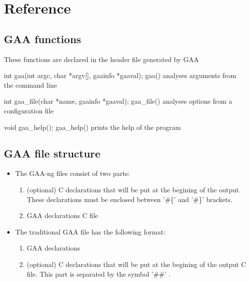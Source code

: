 \chapter{Reference}

\section{GAA functions}
These functions are declared in the header file generated by GAA

\par int gaa(int argc, char *argv[], gaainfo *gaaval);
gaa() analyses arguments from the command line


 int gaa\_file(char *name, gaainfo *gaaval);
gaa\_file() analyses options from a configuration file

 void gaa\_help();
gaa\_help() prints the help of the program


\section{GAA file structure}

\begin{itemize}

\item The GAA-ng files consist of two parts:
\begin{enumerate}
 \item  (optional) C declarations that will be put at the begining of the
output. These declarations must be enclosed between '\#\{' and '\#\}'
brackets. 
 \item  GAA declarations
C file
\end{enumerate}

\item The traditional GAA file has the following format:
\begin{enumerate}
 \item  GAA declarations
 \item (optional) C declarations that will be put at the begining of the output
C file. This part is separated by the symbol '\#\#' .

\end{enumerate}
\end{itemize}

